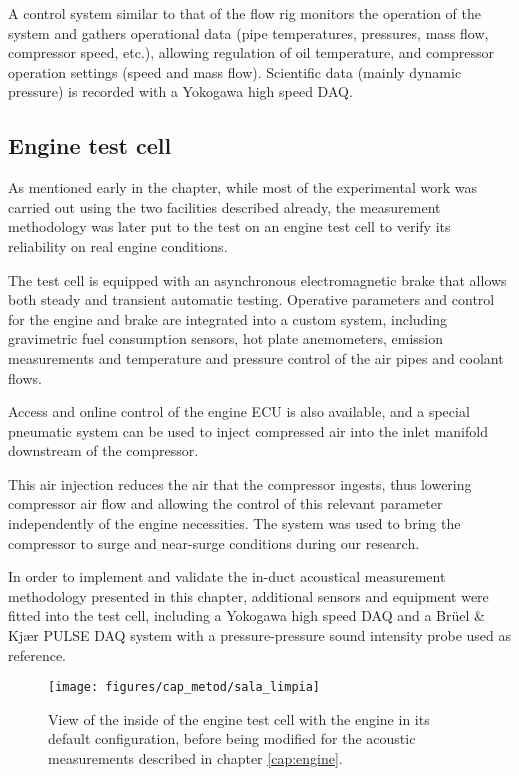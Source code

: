A control system similar to that of the flow rig monitors the operation of the system and gathers operational data (pipe temperatures, pressures, mass flow, compressor speed, etc.), allowing regulation of oil temperature, and compressor operation settings (speed and mass flow). Scientific data (mainly dynamic pressure) is recorded with a Yokogawa high speed DAQ.

\subsection{Engine test cell} \label{sub:engine_cell}

As mentioned early in the chapter, while most of the experimental work was carried out using the two facilities described already, the measurement methodology was later put to the test on an engine test cell to verify its reliability on real engine conditions.

The test cell is equipped with an asynchronous electromagnetic brake that allows both steady and transient automatic testing. Operative parameters and control for the engine and brake are integrated into a custom system, including gravimetric fuel consumption sensors, hot plate anemometers, emission measurements and temperature and pressure control of the air pipes and coolant flows.

Access and online control of the engine ECU is also available, and a special pneumatic system can be used to inject compressed air into the inlet manifold downstream of the compressor.

This air injection reduces the air that the compressor ingests, thus lowering compressor air flow and allowing the control of this relevant parameter independently of the engine necessities. The system was used to bring the compressor to surge and near-surge conditions during our research.

In order to implement and validate the in-duct acoustical measurement methodology presented in this chapter, additional sensors and equipment were fitted into the test cell, including a Yokogawa high speed DAQ and a Brüel \& Kjær PULSE DAQ system with a pressure-pressure sound intensity probe used as reference.

\begin{figure}[b!]
\centering
\texttt{[image: figures/cap\_metod/sala\_limpia]}
\caption{View of the inside of the engine test cell with the engine in its default configuration, before being modified for the acoustic measurements described in chapter \ref{cap:engine}.}
\label{fig:engine_cell_clear}
\end{figure}

